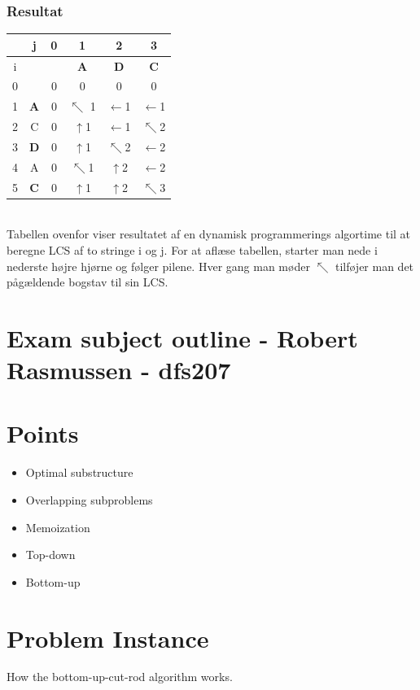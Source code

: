 \documentclass[12pt]{article}
\begin{document}
\subsubsection*{Resultat}
\begin{tabular}{ c|c|c|c|c|c}
  &j&0&1&2&3\\ \hline
  i&&&\textbf{A}&\textbf{D}&\textbf{C}\\ \hline
  0&&0&0&0&0\\ \hline
  1&\textbf{A}&0&$\nwarrow$ 1&$\leftarrow$1&$\leftarrow$1\\ \hline
  2&C&0&$\uparrow$1&$\leftarrow$1&$\nwarrow$2\\ \hline
  3&\textbf{D}&0&$\uparrow$1&$\nwarrow$2&$\leftarrow$2\\ \hline
  4&A&0&$\nwarrow$1&$\uparrow$2&$\leftarrow$2\\ \hline
  5&\textbf{C}&0&$\uparrow$1&$\uparrow$2&$\nwarrow$3\\
\end{tabular}\\
Tabellen ovenfor viser resultatet af en dynamisk programmerings algortime til at beregne LCS af to stringe i og j.
For at aflæse tabellen, starter man nede i nederste højre hjørne og følger pilene. Hver gang man møder $\nwarrow$ tilføjer man det pågældende bogstav til sin LCS.
\newpage
\section*{Exam subject outline - Robert Rasmussen - dfs207}
\section{Points}
\begin{itemize}
\item Optimal substructure
\item Overlapping subproblems
\item Memoization
\item Top-down
\item Bottom-up 
\end{itemize}

\section{Problem Instance}
How the bottom-up-cut-rod algorithm works.
\end{document}
